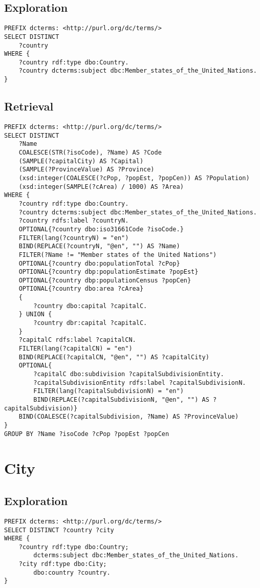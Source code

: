 \documentclass[11pt]{article}
\begin{document}
\subsection{Exploration}
{\footnotesize\begin{verbatim}
PREFIX dcterms: <http://purl.org/dc/terms/>
SELECT DISTINCT 
    ?country
WHERE {
    ?country rdf:type dbo:Country. 
    ?country dcterms:subject dbc:Member_states_of_the_United_Nations. 
}
\end{verbatim}}


\subsection{Retrieval}
{\footnotesize\begin{verbatim}
PREFIX dcterms: <http://purl.org/dc/terms/>
SELECT DISTINCT 
    ?Name
    COALESCE(STR(?isoCode), ?Name) AS ?Code
    (SAMPLE(?capitalCity) AS ?Capital)
    (SAMPLE(?ProvinceValue) AS ?Province)
    (xsd:integer(COALESCE(?cPop, ?popEst, ?popCen)) AS ?Population)
    (xsd:integer(SAMPLE(?cArea) / 1000) AS ?Area)
WHERE {
    ?country rdf:type dbo:Country. 
    ?country dcterms:subject dbc:Member_states_of_the_United_Nations. 
    ?country rdfs:label ?countryN.
    OPTIONAL{?country dbo:iso31661Code ?isoCode.}
    FILTER(lang(?countryN) = "en")
    BIND(REPLACE(?countryN, "@en", "") AS ?Name)
    FILTER(?Name != "Member states of the United Nations")
    OPTIONAL{?country dbo:populationTotal ?cPop}
    OPTIONAL{?country dbp:populationEstimate ?popEst}
    OPTIONAL{?country dbp:populationCensus ?popCen}
    OPTIONAL{?country dbo:area ?cArea}
    {
        ?country dbo:capital ?capitalC.
    } UNION {
        ?country dbr:capital ?capitalC.
    }
    ?capitalC rdfs:label ?capitalCN. 
    FILTER(lang(?capitalCN) = "en")
    BIND(REPLACE(?capitalCN, "@en", "") AS ?capitalCity)
    OPTIONAL{ 
        ?capitalC dbo:subdivision ?capitalSubdivisionEntity.
        ?capitalSubdivisionEntity rdfs:label ?capitalSubdivisionN.
        FILTER(lang(?capitalSubdivisionN) = "en")
        BIND(REPLACE(?capitalSubdivisionN, "@en", "") AS ?capitalSubdivision)}
    BIND(COALESCE(?capitalSubdivision, ?Name) AS ?ProvinceValue)
}
GROUP BY ?Name ?isoCode ?cPop ?popEst ?popCen
\end{verbatim}}

\section{City}

\subsection{Exploration}
{\footnotesize\begin{verbatim}
PREFIX dcterms: <http://purl.org/dc/terms/>
SELECT DISTINCT ?country ?city
WHERE {
    ?country rdf:type dbo:Country;
        dcterms:subject dbc:Member_states_of_the_United_Nations.
    ?city rdf:type dbo:City;
        dbo:country ?country.
}
\end{verbatim}}
\end{document}
